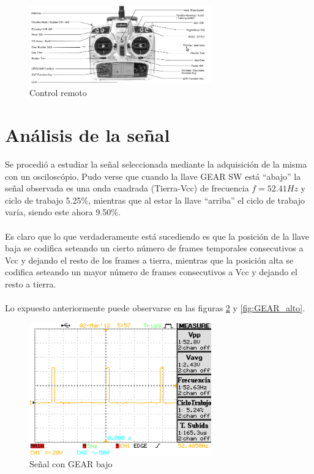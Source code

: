 \documentclass[main]{subfiles}
\begin{document}
\begin{figure}[H]
\begin{center}
\includegraphics[width=0.7\textwidth]{./pics_switcheo/control.png}
\caption{Control remoto}
\label{fig:control}
\end{center}
\end{figure}

\section{Análisis de la señal}

Se procedió a estudiar la señal seleccionada mediante la adquisición de la misma con un osciloscópio. Pudo verse que cuando la llave GEAR SW está ``abajo'' la señal observada es una onda cuadrada (Tierra-Vcc) de frecuencia $f=52.41Hz$ y ciclo de trabajo 5.25\%, mientras que al estar la llave ``arriba'' el ciclo de trabajo varía, siendo este ahora 9.50\%.\\
\\
Es claro que lo que verdaderamente está sucediendo es que la posición de la llave baja se codifica seteando un cierto número de  frames temporales consecutivos a Vcc y dejando el resto de los frames a tierra, mientras que la posición alta se codifica seteando un mayor número de frames consecutivos a Vcc y dejando el resto a tierra.\\
\\
Lo expuesto anteriormente puede observarse en las figuras \ref{fig:GEAR_bajo} y \ref{fig:GEAR_alto}.

\begin{figure}[H]
\begin{center}
\includegraphics[width=0.7\textwidth]{./pics_switcheo/GEAR_bajo.png}
\caption{Señal con GEAR bajo}
\label{fig:GEAR_bajo}
\end{center}
\end{figure}
\end{document}
